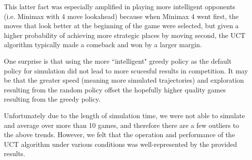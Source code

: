 \documentclass[12pt,letterpaper]{article}
\begin{document}
This latter fact was especially amplified in playing more intelligent opponents (i.e. Minimax with 4 move lookahead) because when Minimax 4 went first, the moves that look better at the beginning of the game were selected, but given a higher probability of achieving more strategic places by moving second, the UCT algorithm typically made a comeback and won by a larger margin.

One surprise is that using the more ``intelligent" greedy policy as the default policy for simulation did not lead to more scucesful results in competition. It may be that the greater speed (meaning more simulated trajectories) and exploration resulting from the random policy offset the hopefully higher quality games resulting from the greedy policy.

Unfortunately due to the length of simulation time, we were not able to simulate and average over more than 10 games, and therefore there are a few outliers to the above trends.  However, we felt that the operation and performance of the UCT algorithm under various conditions was well-represented by the provided results.
\end{document}
